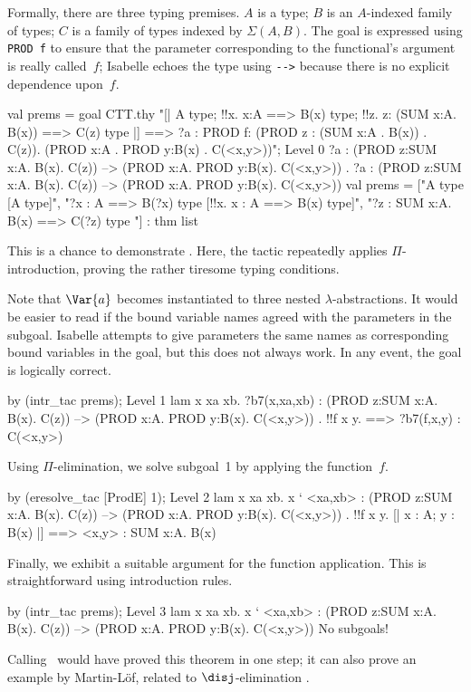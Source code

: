 Formally, there are three typing premises.  $A$ is a type; $B$ is an
$A$-indexed family of types; $C$ is a family of types indexed by
$\Sigma(A,B)$.  The goal is expressed using \hbox{\tt PROD f} to ensure
that the parameter corresponding to the functional's argument is really
called~$f$; Isabelle echoes the type using \verb|-->| because there is no
explicit dependence upon~$f$.
\begin{ttbox}
val prems = goal CTT.thy
    "[| A type; !!x. x:A ==> B(x) type;                           \ttback
\ttback               !!z. z: (SUM x:A. B(x)) ==> C(z) type             \ttback
\ttback    |] ==> ?a : PROD f: (PROD z : (SUM x:A . B(x)) . C(z)).      \ttback
\ttback                     (PROD x:A . PROD y:B(x) . C(<x,y>))";
\ttbreak
{\out Level 0}
{\out ?a : (PROD z:SUM x:A. B(x). C(z)) -->}
{\out      (PROD x:A. PROD y:B(x). C(<x,y>))}
{. ?a : (PROD z:SUM x:A. B(x). C(z)) -->}
{\out          (PROD x:A. PROD y:B(x). C(<x,y>))}
\ttbreak
{\out val prems = ["A type  [A type]",}
{\out              "?x : A ==> B(?x) type  [!!x. x : A ==> B(x) type]",}
{\out              "?z : SUM x:A. B(x) ==> C(?z) type}
{\out               [!!z. z : SUM x:A. B(x) ==> C(z) type]"] : thm list}
\end{ttbox}
This is a chance to demonstrate .  Here, the tactic
repeatedly applies $\Pi$-introduction, proving the rather
tiresome typing conditions.  

Note that $\Var{a}$ becomes instantiated to three nested
$\lambda$-abstractions.  It would be easier to read if the bound variable
names agreed with the parameters in the subgoal.  Isabelle attempts to give
parameters the same names as corresponding bound variables in the goal, but
this does not always work.  In any event, the goal is logically correct.
\begin{ttbox}
by (intr_tac prems);
{\out Level 1}
{\out lam x xa xb. ?b7(x,xa,xb)}
{\out : (PROD z:SUM x:A. B(x). C(z)) --> (PROD x:A. PROD y:B(x). C(<x,y>))}
{. !!f x y.}
{ ==>}
{\out        ?b7(f,x,y) : C(<x,y>)}
\end{ttbox}
Using $\Pi$-elimination, we solve subgoal~1 by applying the function~$f$.
\begin{ttbox}
by (eresolve_tac [ProdE] 1);
{\out Level 2}
{\out lam x xa xb. x ` <xa,xb>}
{\out : (PROD z:SUM x:A. B(x). C(z)) --> (PROD x:A. PROD y:B(x). C(<x,y>))}
{. !!f x y. [| x : A; y : B(x) |] ==> <x,y> : SUM x:A. B(x)}
\end{ttbox}
Finally, we exhibit a suitable argument for the function application.  This
is straightforward using introduction rules.
\begin{ttbox}
by (intr_tac prems);
{\out Level 3}
{\out lam x xa xb. x ` <xa,xb>}
{\out : (PROD z:SUM x:A. B(x). C(z)) --> (PROD x:A. PROD y:B(x). C(<x,y>))}
{\out No subgoals!}
\end{ttbox}
Calling~ would have proved this theorem in one step; it can
also prove an example by Martin-L\"of, related to $\disj$-elimination
\cite[page~58]{martinlof84}.


